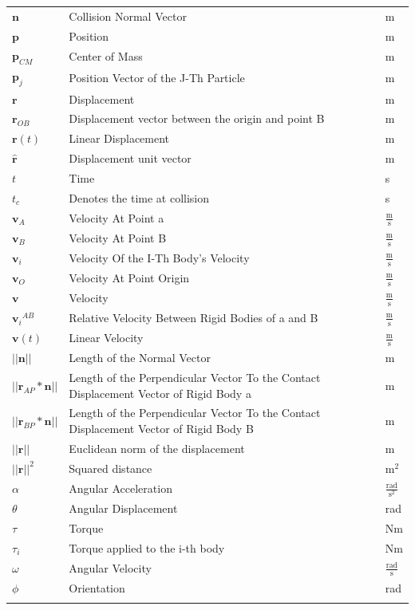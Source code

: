 \documentclass[12pt]{article}
\begin{document}
\begin{longtabu}{l X[l] l}
\\
$\mathbf{n}$ & Collision Normal Vector & m
\\
$\mathbf{p}$ & Position & m
\\
${\mathbf{p}_{CM}}$ & Center of Mass & m
\\
${\mathbf{p}_{j}}$ & Position Vector of the J-Th Particle & m
\\
$\mathbf{r}$ & Displacement & m
\\
${\mathbf{r}_{OB}}$ & Displacement vector between the origin and point B & m
\\
$\mathbf{r}(t)$ & Linear Displacement & m
\\
$\mathbf{\hat{r}}$ & Displacement unit vector & m
\\
$t$ & Time & s
\\
${t_{c}}$ & Denotes the time at collision & s
\\
${\mathbf{v}_{A}}$ & Velocity At Point a & $\frac{\text{m}}{\text{s}}$
\\
${\mathbf{v}_{B}}$ & Velocity At Point B & $\frac{\text{m}}{\text{s}}$
\\
${\mathbf{v}_{i}}$ & Velocity Of the I-Th Body's Velocity & $\frac{\text{m}}{\text{s}}$
\\
${\mathbf{v}_{O}}$ & Velocity At Point Origin & $\frac{\text{m}}{\text{s}}$
\\
$\mathbf{v}$ & Velocity & $\frac{\text{m}}{\text{s}}$
\\
${{\mathbf{v}_{i}}^{AB}}$ & Relative Velocity Between Rigid Bodies of a and B & $\frac{\text{m}}{\text{s}}$
\\
$\mathbf{v}(t)$ & Linear Velocity & $\frac{\text{m}}{\text{s}}$
\\
$||\mathbf{n}||$ & Length of the Normal Vector & m
\\
$||{\mathbf{r}_{AP}}*\mathbf{n}||$ & Length of the Perpendicular Vector To the Contact Displacement Vector of Rigid Body a & m
\\
$||{\mathbf{r}_{BP}}*\mathbf{n}||$ & Length of the Perpendicular Vector To the Contact Displacement Vector of Rigid Body B & m
\\
$||\mathbf{r}||$ & Euclidean norm of the displacement & m
\\
${||\mathbf{r}||^{2}}$ & Squared distance & $\text{m}^{2}$
\\
$α$ & Angular Acceleration & $\frac{\text{rad}}{\text{s}^{2}}$
\\
$θ$ & Angular Displacement & rad
\\
$τ$ & Torque & Nm
\\
${τ_{i}}$ & Torque applied to the i-th body & Nm
\\
$ω$ & Angular Velocity & $\frac{\text{rad}}{\text{s}}$
\\
$ϕ$ & Orientation & rad
\\
\bottomrule
\label{Table:ToS}
\end{longtabu}
\end{document}
